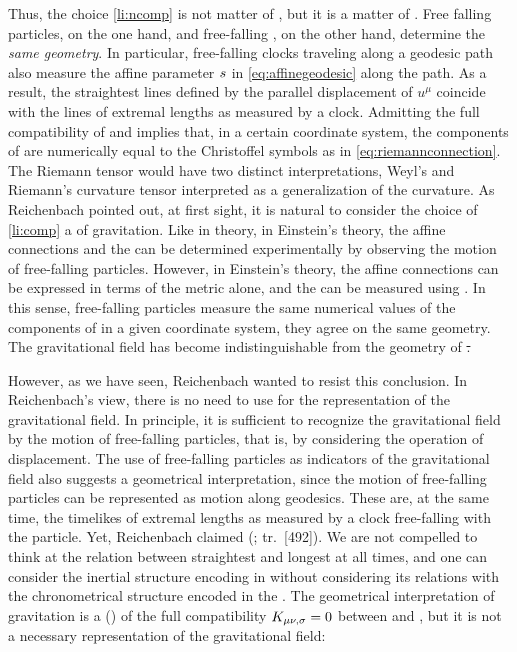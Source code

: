 \documentclass[submitted]{article}
\newcommand{\til}{timelike\xspace}
\renewcommand{\rzlap}[2]{(\cite[#1]{Reichenbach1928}; tr.\ [#2])\xspace}
\begin{document}

Thus, the choice \cref{li:ncomp} is not matter of , but it is a matter of  . Free falling particles, on the one hand, and free-falling \rac, on the other hand, determine the \emph{same geometry}. In particular, free-falling clocks traveling along a geodesic path also measure the affine parameter $s$ in \cref{eq:affinegeodesic} along the path. As a result, the straightest lines defined by the parallel displacement of $u^\mu$ coincide with the lines of extremal lengths as measured by a clock. Admitting the full compatibility of \gmn and \Gtmn implies that, in a certain coordinate system, the components of \Gtmn are numerically equal to the Christoffel symbols as in \cref{eq:riemannconnection}. The Riemann tensor would have two distinct interpretations, Weyl's  \ritea and Riemann's curvature tensor \riteg interpreted as a generalization of the  curvature. As Reichenbach pointed out, at first sight, it is natural to consider the choice of \cref{li:comp} a  of gravitation. Like in  theory, in Einstein's theory, the affine connections and the \ritea can be determined experimentally by observing the motion of free-falling particles. However, in Einstein's theory, the affine connections \Gtmn can be expressed in terms of the metric \gmn alone, and the \riteg can be measured using \rac. In this sense, free-falling particles measure the same numerical values of the components of \rite in a given coordinate system, \ie they agree on the same geometry. The gravitational field has become indistinguishable from the geometry of \st.

However, as we have seen, Reichenbach wanted to resist this conclusion. In Reichenbach's view, there is no need to use \rac for the representation of the gravitational field. In principle, it is sufficient to recognize the gravitational field by the motion of free-falling particles, that is, by considering the operation of displacement. The use of free-falling particles as indicators of the gravitational field also suggests a geometrical interpretation, since the motion of free-falling particles can be represented as motion along geodesics. These are, at the same time, the \til \wl{}s of extremal lengths as measured by a clock free-falling with the particle. Yet, Reichenbach claimed  \rzlap{353}{492}. We are not compelled to think at the relation between straightest and longest \wl{} at all times, and one can consider the inertial structure encoding in \Gtmn without considering its relations with the chronometrical structure encoded in the \gmn. The geometrical interpretation of gravitation is a  () of the full compatibility $K_{\mu \nu, \sigma}=0$ between \gmn and \Gtmn, but it is not a necessary representation of the gravitational field:
\end{document}
